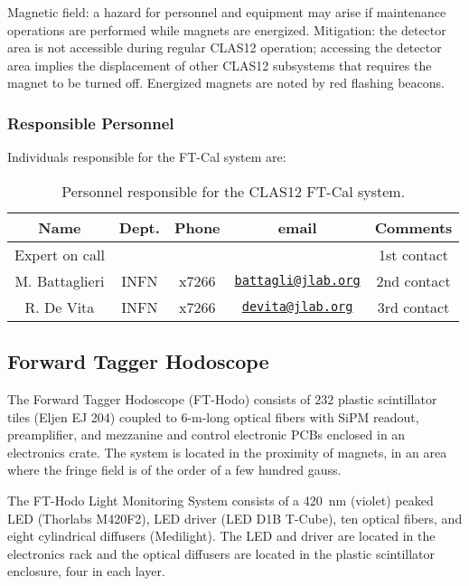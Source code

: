 Magnetic field: a hazard for personnel and equipment may arise if maintenance operations are 
performed while magnets are energized. Mitigation: the detector area is not accessible during 
regular CLAS12 operation; accessing the detector area implies the displacement of other CLAS12 
subsystems that requires the magnet to be turned off. Energized magnets are noted by red flashing 
beacons.

\vfil
\eject

\subsubsection{Responsible Personnel}

Individuals responsible for the FT-Cal system are:

\begin{table}[!htb]
\centering
\begin{tabular}{|c|c|c|c|c|} \hline
Name&Dept.&Phone&email&Comments \\ \hline
Expert on call& &&& 1st contact \\ \hline
M. Battaglieri& INFN&x7266&\href{mailto:battagli@jlab.org}{\nolinkurl{battagli@jlab.org}}&2nd contact \\ \hline
R. De Vita & INFN&x7266&\href{mailto:devita@jlab.org}{\nolinkurl{devita@jlab.org}}& 3rd contact  \\ \hline
\end{tabular}
\caption{Personnel responsible for the CLAS12 FT-Cal system.} 
\label{tb:ecal}
\end{table}

\subsection{Forward Tagger Hodoscope}

The Forward Tagger Hodoscope (FT-Hodo) consists of $232$ plastic scintillator tiles (Eljen 
EJ 204) coupled to 6-m-long optical fibers with SiPM readout, preamplifier, and mezzanine 
and control electronic PCBs enclosed in an electronics crate. The system is located in the 
proximity of magnets, in an area where the fringe field is of the order of a few hundred gauss.

The FT-Hodo Light Monitoring System consists of a 420~nm (violet) peaked LED (Thorlabs M420F2), 
LED driver (LED D1B T-Cube), ten optical fibers, and eight cylindrical diffusers (Medilight). 
The LED and driver are located in the electronics rack and the optical diffusers are located 
in the plastic scintillator enclosure, four in each layer.


